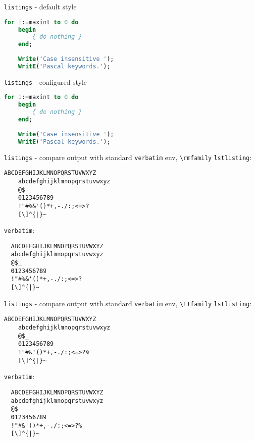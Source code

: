 \documentclass{article}
\begin{document}
\begin{example}{\texttt{listings} - default style}
  \begin{lstlisting}[language=pascal]
    for i:=maxint to 0 do
    begin
        { do nothing }
    end;
    
    Write('Case insensitive ');
    WritE('Pascal keywords.');
  \end{lstlisting}
\end{example}

\begin{example}{\texttt{listings} - configured style}
  \begin{lstlisting}[language=pascal, basicstyle=\ttfamily]
    for i:=maxint to 0 do
    begin
        { do nothing }
    end;
    
    Write('Case insensitive ');
    WritE('Pascal keywords.');
  \end{lstlisting}
\end{example}

\begin{example}{\texttt{listings} - compare output with standard \texttt{verbatim} env, \texttt{\textbackslash rmfamily}}
  \texttt{lstlisting}:
  \begin{lstlisting}[columns=flexible]
    ABCDEFGHIJKLMNOPQRSTUVWXYZ
    abcdefghijklmnopqrstuvwxyz
    @$_
    0123456789
    !"#%&'()*+,-./:;<=>?
    [\]^{|}~
  \end{lstlisting}
  
  \makeatletter
  \renewcommand\verbatim@font{\normalfont\rmfamily}
  \makeatother
  
  \texttt{verbatim}:
  \begin{verbatim}
  ABCDEFGHIJKLMNOPQRSTUVWXYZ
  abcdefghijklmnopqrstuvwxyz
  @$_
  0123456789
  !"#%&'()*+,-./:;<=>?
  [\]^{|}~
  \end{verbatim}
\end{example}

\begin{example}{\texttt{listings} - compare output with standard \texttt{verbatim} env, \texttt{\textbackslash ttfamily}}
  \texttt{lstlisting}:
  \begin{lstlisting}[columns=flexible, basicstyle=\ttfamily]
    ABCDEFGHIJKLMNOPQRSTUVWXYZ
    abcdefghijklmnopqrstuvwxyz
    @$_
    0123456789
    !"#&'()*+,-./:;<=>?%
    [\]^{|}~
  \end{lstlisting}
  
  \texttt{verbatim}:
  \begin{verbatim}
  ABCDEFGHIJKLMNOPQRSTUVWXYZ
  abcdefghijklmnopqrstuvwxyz
  @$_
  0123456789
  !"#&'()*+,-./:;<=>?%
  [\]^{|}~
  \end{verbatim}
\end{example}
\end{document}
